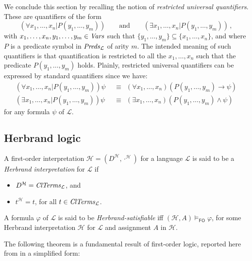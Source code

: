 \documentclass[a4paper]{llncs}
\newcommand{\Lang}{\ensuremath{\mathcal{L}\xspace}} %
\newcommand{\LangPreds}{\Preds_{\Lang}}
\newcommand{\LangClTerms}{\ClTerms_{\Lang}}
\newcommand{\hinter}{\ensuremath{\mathcal{H}}}
\newcommand{\fomodels}[2]{#1 \models_{\mathsf{FO}} #2}
\begin{document}
We conclude this section by recalling the notion of \emph{restricted 
universal quantifiers}. These are quantifiers of the form
\[
  (\forall x_1, \ldots, x_n | P(y_1, \ldots, y_m)) \qquad \text{and} 
\qquad (\exists x_1, \ldots, x_n | P(y_1, \ldots, y_m))\,,
\]
with $x_1, \ldots, x_n, y_1, \ldots, y_m \in \mathit{Vars}$ such that
$\{y_1, \ldots, y_m\}\subseteq\{x_1, \ldots, x_n\}$,
and where $P$ is a predicate symbol in $\LangPreds$ of arity $m$.
%
The intended meaning of such quantifiers is that
quantification is restricted to all the $x_1, \ldots, x_n$ such that 
the predicate $P(y_1, \ldots, y_m)$ holds.
Plainly, restricted universal quantifiers can be expressed by 
standard quantifiers since we have:
\begin{align*}
(\forall x_1, \ldots, x_n | P(y_1, \ldots, y_m))\psi &~~\equiv~~
  (\forall x_1, \ldots, x_n)(P(y_1, \ldots, y_m)  \rightarrow \psi) \\
%
(\exists x_1, \ldots, x_n | P(y_1, \ldots, y_m))\psi &~~\equiv~~
  (\exists x_1, \ldots, x_n)(P(y_1, \ldots, y_m)  \wedge \psi)
\end{align*}
for any formula $\psi$ of $\Lang$.

\subsection{Herbrand logic}

A first-order interpretation $\hinter=(D^{\hinter},\cdot^\hinter)$
for a language $\Lang$
is said to be a \emph{Herbrand interpretation} for $\Lang$ if
\begin{itemize}
\item $D^{\hinter} = \LangClTerms$, and

\item $t^{\hinter} = t$,  for all $t \in \LangClTerms$.
\end{itemize}
A formula $\varphi$ of $\Lang$ is said to be
\emph{Herbrand-satisfiable} iff
$\fomodels{(\hinter,A)}{\varphi}$, for some Herbrand interpretation 
$\hinter$ for $\Lang$ and assignment $A$ in $\hinter$.

The following theorem is a fundamental result of first-order
logic, reported here from \cite[Theorem 5.9.4]{Fitting96}
in a simplified form:
\end{document}

